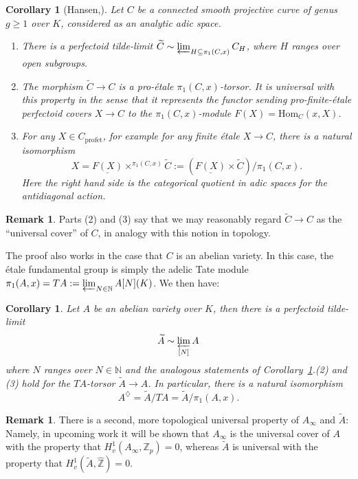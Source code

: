 \documentclass[10pt,oneside]{amsart}
\newtheorem{corollary}[theorem]{Corollary}
\theoremstyle{definition}
\newtheorem{remark}[theorem]{Remark}
\newcommand{\N}{\mathbb{N}}
\newcommand{\Z}{\mathbb{Z}}
\begin{document}
	\begin{corollary}[Hansen,\cite{Hansen-blog}]\label{c:universal-covers-of-curves}
		Let $C$ be a connected smooth projective curve of genus $g\geq 1$ over $K$, considered as an analytic adic space.
		\begin{enumerate}
		\item There is a perfectoid tilde-limit $\widetilde{C} \sim \varprojlim_{H\subseteq \pi_1(C,x)}C_H$, where $H$ ranges over open subgroups.
		\item The morphism $\widetilde{C}\to C$ is a pro-\'etale $\pi_1(C,x)$-torsor. It is universal with this property in the sense that it represents the functor sending	 pro-finite-\'etale perfectoid covers $X\to C$ to the $\pi_1(C,x)$-module $F(X)=\mathrm{Hom}_C(x,X)$.
		\item For any $X\in C_{\mathrm{prof\acute{e}t}}$, for example for any finite \'etale $X\to C$, there is a natural isomorphism
		\[ X = \underline{F(X)}\times^{\pi_1(C,x)}\widetilde{C}:=(\underline{F(X)}\times \widetilde{C})/\pi_1(C,x).\]
		Here the right hand side is the categorical quotient in adic spaces for the antidiagonal action.
	\end{enumerate}
	\end{corollary}
\begin{remark}
Parts (2) and (3) say that we may reasonably regard $\widetilde{C}\to C$ as the ``universal cover'' of $C$, in analogy with this notion in topology.
\end{remark}
The proof also works in the case that $C$ is an abelian variety. In this case, the \'etale fundamental group is simply the adelic Tate module  $\pi_1(A,x)=TA:=\varprojlim_{N\in \N} A[N](K)$. We then have:
\begin{corollary}\label{c:universal-covers-of-abelian-varieties}
	Let $A$ be an abelian variety over $K$, then there is a perfectoid tilde-limit \[\widetilde{A}\sim \varprojlim_{[N]}A\]
	where $N$ ranges over $N\in \N$
	and the analogous statements of Corollary~\ref{c:universal-covers-of-curves}.(2) and (3) hold for the $TA$-torsor $\widetilde{A}\to A$. In particular, there is a natural isomorphism
	\[A^{\diamondsuit}=\widetilde{A}/TA =\widetilde{A}/\pi_1(A,x).\]
\end{corollary}
\begin{remark}There is a second, more topological universal property of $A_\infty$ and $\widetilde{A}$: Namely, in upcoming work it will be shown that $A_\infty$ is the universal cover of $A$ with the property that $H^1_v(A_\infty,\Z_p)=0$, whereas $\widetilde{A}$ is universal with the property that $H^1_v(\widetilde{A},\widehat{\Z})=0$.
\end{remark}
\end{document}
